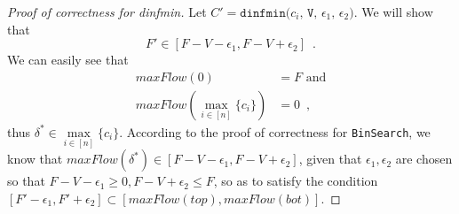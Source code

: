 \begin{proof}[Proof of correctness for dinfmin]
  Let $C' = \texttt{dinfmin(}c_i\texttt{, V, } \epsilon_1\texttt{, } \epsilon_2\texttt{)}$. We will show that
  \begin{equation*}
    F' \in [F - V - \epsilon_1, F - V + \epsilon_2] \enspace.
  \end{equation*}
  We can easily see that
  \begin{align*}
    maxFlow\left(0\right) &= F \mbox{ and} \\
    maxFlow\left(\max\limits_{i \in [n]}\{c_i\}\right) &= 0 \enspace,
  \end{align*}
  thus $\delta^* \in \max\limits_{i \in [n]}\{c_i\}$. According to the proof of correctness for \texttt{BinSearch}, we know
  that $maxFlow\left(\delta^*\right) \in \left[F - V - \epsilon_1, F - V + \epsilon_2\right]$, given that
  $\epsilon_1, \epsilon_2$ are chosen so that $F - V - \epsilon_1 \geq 0, F - V + \epsilon_2 \leq F$, so as to satisfy
  the condition $\left[F' - \epsilon_1, F' + \epsilon_2\right] \subset \left[maxFlow\left(top\right),
  maxFlow\left(bot\right)\right]$.
\end{proof}
